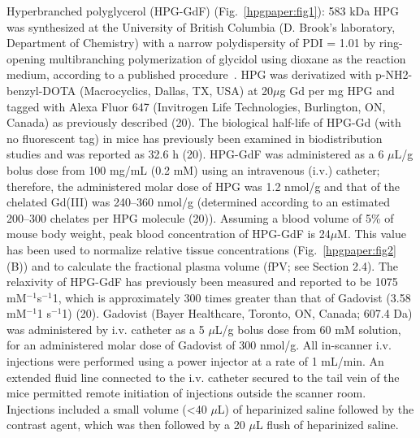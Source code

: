 Hyperbranched polyglycerol (HPG-GdF) (Fig.~\ref{hpgpaper:fig1}): 583 kDa HPG was synthesized at the University of British Columbia (D. Brook’s laboratory, Department of Chemistry) with a narrow polydispersity of PDI = 1.01 by ring-opening multibranching polymerization of glycidol using dioxane as the reaction medium, according to a published procedure~\cite{Kainthan:2006ce}.
HPG was derivatized with p-NH2-benzyl-DOTA (Macrocyclics, Dallas, TX, USA) at 20$\mu$g Gd per mg HPG and tagged with Alexa Fluor 647 (Invitrogen Life Technologies, Burlington, ON, Canada) as previously described (20).
The biological half-life of HPG-Gd (with no fluorescent tag) in mice has previously been examined in biodistribution studies and was reported as 32.6 h (20).
HPG-GdF was administered as a 6 $\mu$L/g bolus dose from 100 mg/mL (0.2 mM) using an intravenous (i.v.) catheter; therefore, the administered molar dose of HPG was 1.2 nmol/g and that of the chelated Gd(III) was 240–360 nmol/g (determined according to an estimated 200–300 chelates per HPG molecule (20)).
Assuming a blood volume of 5\% of mouse body weight, peak blood concentration of HPG-GdF is 24$\mu$M.
This value has been used to normalize relative tissue concentrations (Fig.~\ref{hpgpaper:fig2}(B)) and to calculate the fractional plasma volume (fPV; see Section 2.4).
The relaxivity of HPG-GdF has previously been measured and reported to be 1075 mM$^{-1}$s$^{-1}$1, which is approximately 300 times greater than that of Gadovist (3.58 mM$^{-1}$1 s$^{-1}$1) (20).
Gadovist (Bayer Healthcare, Toronto, ON, Canada; 607.4 Da) was administered by i.v. catheter as a 5 $\mu$L/g bolus dose from 60 mM solution, for an administered molar dose of Gadovist of 300 nmol/g.
All in-scanner i.v.
injections were performed using a power injector at a rate of 1 mL/min.
An extended fluid line connected to the i.v.
catheter secured to the tail vein of the mice permitted remote initiation of injections outside the scanner room.
Injections included a small volume (<40 $\mu$L) of heparinized saline followed by the contrast agent, which was then followed by a 20 $\mu$L flush of heparinized saline.

